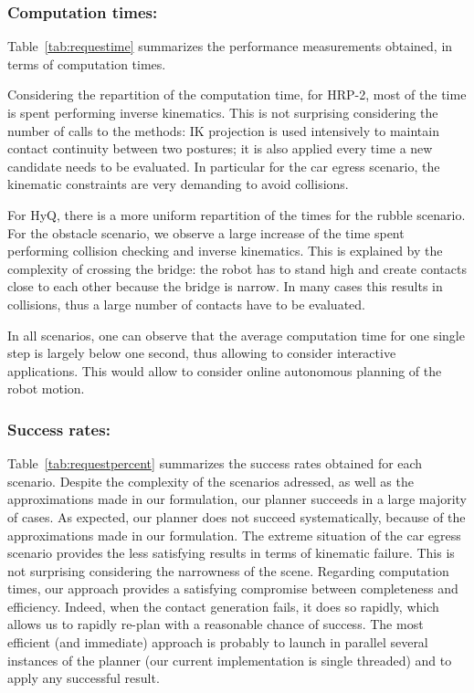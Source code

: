 \subsubsection{Computation times:}
Table~\ref{tab:requestime} summarizes the performance measurements obtained, in terms of computation times.

Considering the repartition of the computation time, for HRP-2, most of the time is spent performing inverse kinematics.
This is not surprising considering the number of calls to the methods: IK projection is used intensively to maintain contact continuity between two postures; 
it is also applied every time a new candidate needs to be evaluated. In particular for the car egress scenario,
the kinematic constraints are very demanding to avoid collisions.

For HyQ, there is a more uniform repartition of the times for the rubble scenario. For the obstacle scenario,
we observe a large increase of the time spent performing collision checking and inverse kinematics. This is explained
by the complexity of crossing the bridge: the robot has to stand high and create contacts close to each other because
the bridge is narrow. In many cases this results in collisions, thus a large number of contacts have to be evaluated.

In all scenarios, one can observe that the average computation time for one single step is largely below one second,
thus allowing to consider \gls{interactive} applications. This would allow to consider online autonomous planning of the robot motion.


\subsubsection{Success rates:}
Table~\ref{tab:requestpercent} summarizes the success rates obtained for each scenario.
Despite the complexity of the scenarios adressed, as well as the approximations made in our formulation, our planner succeeds in a large majority of cases.
As expected, our planner does not succeed systematically, because of the approximations made in our formulation. The extreme situation of the car egress scenario provides the less satisfying results in terms of kinematic failure. This is not
surprising considering the narrowness of the scene.
Regarding computation times, our approach provides a satisfying compromise between completeness and efficiency.
Indeed, when the contact generation fails, it does so rapidly, which allows us to rapidly re-plan with a reasonable chance of success.
The most efficient (and immediate) approach is probably to launch in parallel several instances of the planner (our current implementation is single threaded) and to apply any successful result.

